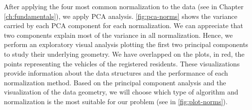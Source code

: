 After applying the four most common normalization to the data (see in Chapter \ref{ch:fundamentals}), we apply PCA analysis. \cref{fig:pca-norms} shows the variance carried by each PCA component for each normalization. We can appreciate that two components explain most of the variance in all normalization. Hence, we perform an exploratory visual analysis plotting the first two principal components to study their underlying geometry. We have overlapped on the plots, in red, the points representing the vehicles of the registered residents. These visualizations provide information about the data structures and the performance of each normalization method. Based on the principal component analysis and the visualization of the data geometry, we will choose which type of algorithm and normalization is the most suitable for our problem (see in \cref{fig:plot-norms}).

